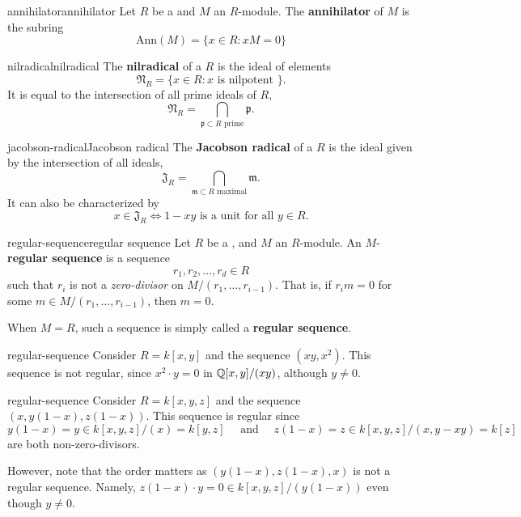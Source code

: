 \begin{topic}{annihilator}{annihilator}
    Let $R$ be a  and $M$ an $R$-module. The \textbf{annihilator} of $M$ is the subring
    \[ \text{Ann}(M) = \{ x \in R : xM = 0 \} \]
\end{topic}

\begin{topic}{nilradical}{nilradical}
     The \textbf{nilradical} of a  $R$ is the ideal of  elements
     \[ \mathfrak{N}_R = \{ x \in R : x \text{ is nilpotent } \} . \]
     It is equal to the intersection of all prime ideals of $R$,
     \[ \mathfrak{N}_R = \bigcap_{\mathfrak{p} \subset R \text{ prime}} \mathfrak{p} . \]
\end{topic}

\begin{topic}{jacobson-radical}{Jacobson radical}
     The \textbf{Jacobson radical} of a  $R$ is the ideal given by the intersection of all  ideals,
     \[ \mathfrak{J}_R = \bigcap_{\mathfrak{m} \subset R \text{ maximal}} \mathfrak{m} . \]
     It can also be characterized by
     \[ x \in \mathfrak{J}_R \iff 1 - xy \text{ is a unit for all } y \in R . \]
\end{topic}

\begin{topic}{regular-sequence}{regular sequence}
    Let $R$ be a , and $M$ an $R$-module. An $M$-\textbf{regular sequence} is a sequence
    \[ r_1, r_2, \ldots, r_d \in R \]
    such that $r_i$ is not a \textit{zero-divisor} on $M/(r_1, \ldots, r_{i - 1})$. That is, if $r_i m = 0$ for some $m \in M / (r_1, \ldots, r_{i - 1})$, then $m = 0$.
    
    When $M = R$, such a sequence is simply called a \textbf{regular sequence}.
\end{topic}

\begin{example}{regular-sequence}
    Consider $R = k[x, y]$ and the sequence $(xy, x^2)$. This sequence is not regular, since $x^2 \cdot y = 0$ in $\mathbb{Q}[x, y] / (xy)$, although $y \ne 0$.
\end{example}

\begin{example}{regular-sequence}
    Consider $R = k[x, y, z]$ and the sequence $(x, y(1 - x), z(1 - x))$. This sequence is regular since
    \[ y(1 - x) = y \in k[x, y, z]/(x) = k[y, z] \quad \text{ and } \quad z(1 - x) = z \in k[x, y, z]/(x, y - xy) = k[z] \]
    are both non-zero-divisors.
    
    However, note that the order matters as $(y(1 - x), z(1 - x), x)$ is not a regular sequence. Namely, $z(1 - x) \cdot y = 0 \in k[x, y, z] / (y(1 - x))$ even though $y \ne 0$.
\end{example}

